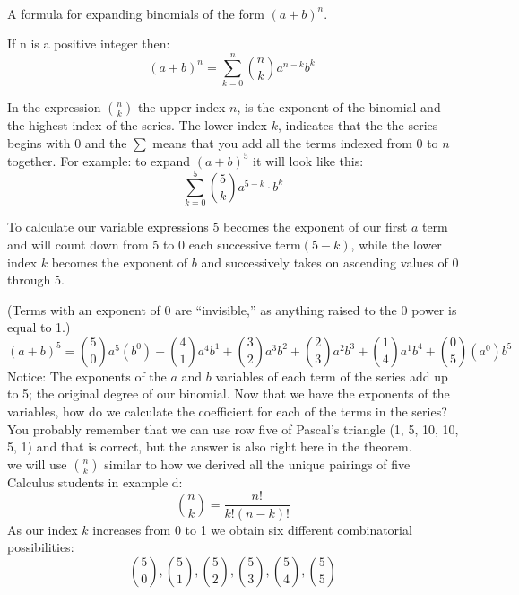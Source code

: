 \documentclass{article}
\begin{document}
  \vspace{3 mm}
 {\\
 
   \vspace{2 mm}
 {\large A formula for expanding binomials of the form $(a+b)^n$}. \\ 
 
 \vspace{3 mm}
  
 \large  If n is a positive integer then:\\
\[
     (a+b)^n = \sum_{k=0}^n \binom{n}{k} a^{n-k} b^{k} \
\]

\vspace{2 mm} In the expression $\binom{n}{k}$ the upper index $n$, is the exponent of the binomial and the highest index of the series. The lower index $k$, indicates that the the series begins with $0$ and the $\sum$ means that you add all the terms indexed from 0 to $n$ together.
\vspace{2 mm}
For example: to expand  $(a + b)^5$  it will look like this:
\[
	\sum_{k=0}^5 \binom{5}{k} a^{5-k} \cdot b^{k}%
\]

To calculate our variable expressions $5$ becomes the exponent of our first $a$ term and will count down from 5 to 0 each successive term$(5 - k)$, while the lower index $k$ becomes the exponent of $b$ and successively takes on ascending values of 0 through 5.\\

\vspace{2 mm}

(Terms with an exponent of 0 are ``invisible,'' as anything raised to the 0 power is equal to 1.)
\[
(a + b)^5 =\binom{5}{0} a^5(b^0)  +   \binom{4}{1}a^4b^1  +   \binom{3}{2}a^3b^2  +   \binom{2}{3}a^2b^3  +   \binom{1}{4}a^1 b^4  +   \binom{0}{5}(a^0) b^5
\]
Notice: The exponents of the $a$ and $b$ variables of each term of the series add up to 5; the original degree of our binomial.
Now that we have the exponents of the variables, how do we calculate the coefficient for each of the terms in the series?\\
\vspace{2 mm}
 You probably remember that we can use row five of Pascal's triangle (1, 5, 10, 10, 5, 1) and that is correct, but the answer is also right here in the theorem.\\
 we will use $\binom{n}{k}$ similar to how we derived all the unique pairings of five Calculus students in example d:
	\[
 \binom{n}{k}=\frac{n!}{k!(n-k)!}
	\]
\vspace{2 mm}As our index $k$ increases from 0 to 1 we obtain six different combinatorial possibilities: 
\[
\binom{5}{0}, \binom{5}{1}, \binom{5}{2}, \binom{5}{3}, \binom{5}{4}, \binom {5}{5}
\]

}
\end{document}

